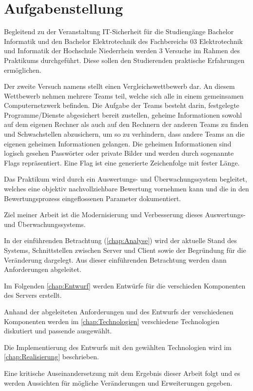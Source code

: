 \section{Aufgabenstellung}
\label{sec:Aufgabenstellung}
Begleitend zu der Veranstaltung IT-Sicherheit für die Studiengänge Bachelor Informatik und den Bachelor Elektrotechnik des Fachbereichs 03 Elektrotechnik und Informatik der Hochschule Niederrhein werden 3 Versuche im Rahmen des Praktikums durchgeführt. Diese sollen den Studierenden praktische Erfahrungen ermöglichen.

Der zweite Versuch namens  stellt einen Vergleichswettbewerb dar. An diesem Wettbewerb nehmen mehrere Teams teil, welche sich alle in einem gemeinsamen Computernetzwerk befinden. Die Aufgabe der Teams besteht darin, festgelegte Programme/Dienste abgesichert bereit zustellen, geheime Informationen sowohl auf dem eigenen Rechner als auch auf den Rechnern der anderen Teams zu finden und Schwachstellen abzusichern, um so zu verhindern, dass andere Teams an die eigenen geheimen Informationen gelangen.\cite[S. 2]{sosnaKonzeptionUndRealisierung2010} Die geheimen Informationen sind logisch gesehen Passwörter oder private Bilder und werden durch sogenannte Flags repräsentiert. Eine Flag ist eine generierte Zeichenfolge mit fester Länge.

Das Praktikum wird durch ein Auswertungs- und Überwachungssystem begleitet, welches eine objektiv nachvollziehbare Bewertung vornehmen kann und die in den Bewertungsprozess eingeflossenen Parameter dokumentiert.\cite[S. 2]{sosnaKonzeptionUndRealisierung2010}

Ziel meiner Arbeit ist die Modernisierung und Verbesserung dieses Auswertungs- und Überwachungssystems.

In der einführenden Betrachtung (\autoref{chap:Analyse}) wird der aktuelle Stand des Systems, Schnittstellen zwischen Server und Client sowie der Begründung für die Veränderung dargelegt. Aus dieser einführenden Betrachtung werden dann Anforderungen abgeleitet.

Im Folgenden \autoref{chap:Entwurf} werden Entwürfe für die verschieden Komponenten des Servers erstellt. 

Anhand der abgeleiteten Anforderungen und des Entwurfs der verschiedenen Komponenten werden im \autoref{chap:Technologien} verschiedene Technologien diskutiert und passende ausgewählt.

Die Implementierung des Entwurfs mit den gewählten Technologien wird im \autoref{chap:Realisierung} beschrieben.

Eine kritische Auseinandersetzung mit dem Ergebnis dieser Arbeit folgt und es werden Aussichten für mögliche Veränderungen und Erweiterungen gegeben.
